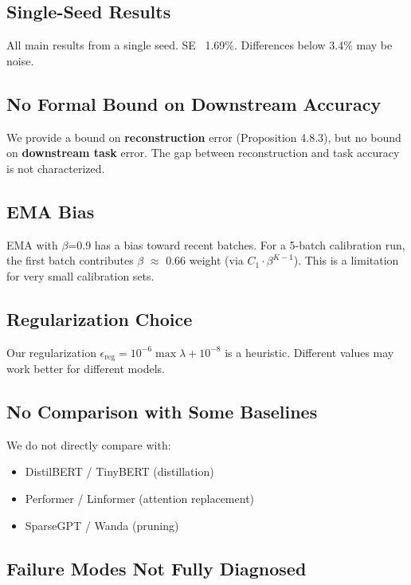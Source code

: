 \subsection{Single-Seed Results}

All main results from a single seed. SE ~1.69\%. Differences below 3.4\% 
may be noise.

\subsection{No Formal Bound on Downstream Accuracy}

We provide a bound on \textbf{reconstruction} error (Proposition 4.8.3), but 
no bound on \textbf{downstream task} error. The gap between reconstruction and 
task accuracy is not characterized.

\subsection{EMA Bias}

EMA with $\beta$=0.9 has a bias toward recent batches. For a 5-batch calibration 
run, the first batch contributes $\beta$  $\approx$ 0.66 weight (via $C_1 \cdot \beta^{K-1}$). 
This is a limitation for very small calibration sets.

\subsection{Regularization Choice}

Our regularization $\epsilon_\text{reg} = 10^{-6} \max \lambda + 10^{-8}$ is 
a heuristic. Different values may work better for different models.

\subsection{No Comparison with Some Baselines}

We do not directly compare with:
\begin{itemize}
\item DistilBERT / TinyBERT (distillation)
\item Performer / Linformer (attention replacement)
\item SparseGPT / Wanda (pruning)

\end{itemize}
\subsection{Failure Modes Not Fully Diagnosed}

